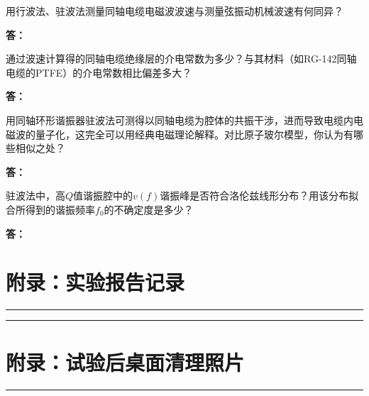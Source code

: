\documentclass[dvipsnames, svgnames,a4paper,11pt]{article}
\newcommand{\answerblank}[1][3.8cm]{%
  \par\nopagebreak[4]\noindent\textbf{答：}\par\nopagebreak[4]\vspace*{#1}}
\newcommand{\recordblank}[1]{%
  \par\noindent\rule{0.95\linewidth}{0pt}\rule{0pt}{#1}\par}
\begin{document}
\begin{question}
	用行波法、驻波法测量同轴电缆电磁波波速与测量弦振动机械波速有何同异？
\end{question}
\answerblank[3.8cm]

\begin{question}
	通过波速计算得的同轴电缆绝缘层的介电常数为多少？与其材料（如RG-142同轴电缆的PTFE）的介电常数相比偏差多大？
\end{question}
\answerblank[3.8cm]

\begin{question}
	用同轴环形谐振器驻波法可测得以同轴电缆为腔体的共振干涉，进而导致电缆内电磁波的量子化，这完全可以用经典电磁理论解释。对比原子玻尔模型，你认为有哪些相似之处？
\end{question}
\answerblank[3.8cm]

\begin{question}
	驻波法中，高$Q$值谐振腔中的$v(f)$谐振峰是否符合洛伦兹线形分布？用该分布拟合所得到的谐振频率$f_0$的不确定度是多少？
\end{question}
\answerblank[3.8cm]

\appendix
\appendixpage
\addappheadtotoc

\section*{附录：实验报告记录}
\recordblank{5cm}

\recordblank{5cm}

\section*{附录：试验后桌面清理照片}
\recordblank{5cm}
\end{document}
